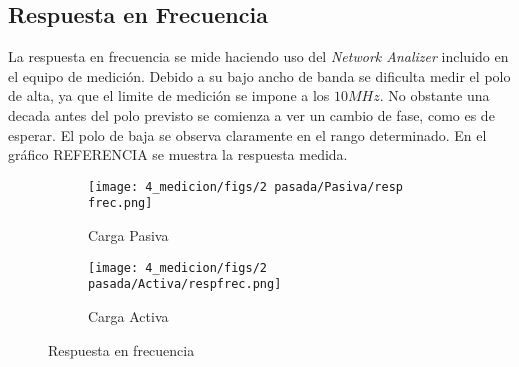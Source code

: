 \subsection{Respuesta en Frecuencia}

La respuesta en frecuencia se mide haciendo uso del \textit{Network Analizer} incluido en el equipo de medición. Debido a su bajo ancho de banda se dificulta medir el polo de alta, ya que el limite de medición se impone a los $10 MHz$. No obstante una decada antes del polo previsto se comienza a ver un cambio de fase, como es de esperar.
El polo de baja se observa claramente en el rango determinado. En el gráfico REFERENCIA se muestra la respuesta medida.

\begin{figure}[ht]
    \begin{subfigure}{.45\textwidth}
      \centering
      \texttt{[image: 4\_medicion/figs/2 pasada/Pasiva/resp frec.png]}  
      \caption{Carga Pasiva}
      \label{fig:frec carga pasiva}
    \end{subfigure}
    \begin{subfigure}{.45\textwidth}
      \centering
      \texttt{[image: 4\_medicion/figs/2 pasada/Activa/respfrec.png]}  
      \caption{Carga Activa}
      \label{fig:frec carga activa}
    \end{subfigure}
    \caption{Respuesta en frecuencia}
    \label{fig:resp frec oscilo}
    \end{figure}





